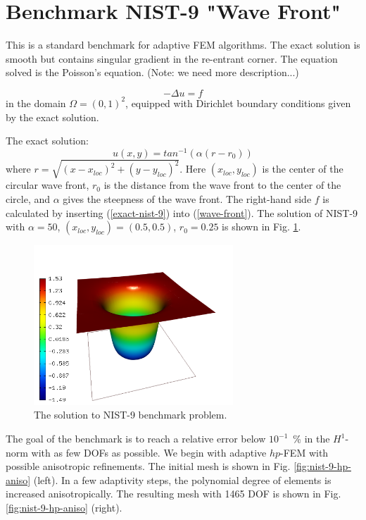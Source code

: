 \section{Benchmark NIST-9 "Wave Front"}
\label{sec:bench-9}

This is a standard benchmark for adaptive FEM algorithms. The exact solution is smooth but contains singular gradient in the re-entrant corner.
The equation solved is the Poisson's equation. (Note: we need more description...)

\begin{equation} \label{wave-front}
-\Delta u = f 
\end{equation}
in the domain $\Omega = (0, 1)^2$, equipped with Dirichlet boundary conditions
given by the exact solution.

The exact solution:
\begin{equation}\label{exact-nist-9}
u(x, y) = tan^{-1}(\alpha (r - r_{0})) 
\end{equation}
where $r = \sqrt{(x - x_{loc})^{2} + (y - y_{loc})^{2}}$.
Here $(x_{loc}, y_{loc})$ is the center of the circular wave front,
$r_{0}$ is the distance from the wave front to the center of the circle,
and $\alpha$ gives the steepness of the wave front.
The right-hand side $f$ is calculated by inserting (\ref{exact-nist-9}) into (\ref{wave-front}).
The solution of NIST-9 with $\alpha = 50$, $(x_{loc}, y_{loc}) = (0.5, 0.5)$,
$r_{0} = 0.25$ is shown in Fig. \ref{fig:sln-nist09}.

\begin{figure}[!ht]
\centering
\includegraphics[height=6cm]{nist/nist-9/solution.png}
\caption{The solution to NIST-9 benchmark problem.}
\label{fig:sln-nist09}
\end{figure}

The goal of the benchmark is to reach a relative error below
$10^{-1}$~\% in the $H^1$-norm with as few DOFs as possible.
We begin with adaptive $hp$-FEM with possible anisotropic refinements.
The initial mesh is shown in Fig. \ref{fig:nist-9-hp-aniso} (left).
In a few adaptivity steps, the polynomial degree of elements is increased
anisotropically.
The resulting mesh with 1465 DOF is shown in Fig. \ref{fig:nist-9-hp-aniso} (right).

